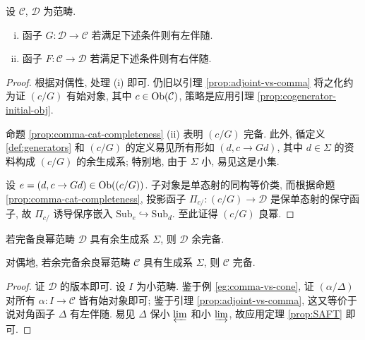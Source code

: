 \begin{theorem}[特殊伴随函子定理]\label{prop:SAFT}
	设 $\mathcal{C}$, $\mathcal{D}$ 为范畴.
	\begin{enumerate}[(i)]
		\item 函子 $G: \mathcal{D} \to \mathcal{C}$ 若满足下述条件则有左伴随.
		\item 函子 $F: \mathcal{C} \to \mathcal{D}$ 若满足下述条件则有右伴随.
	\end{enumerate}
\end{theorem}
\begin{proof}
	根据对偶性, 处理 (i) 即可. 仍旧以引理 \ref{prop:adjoint-vs-comma} 将之化约为证 $(c/G)$ 有始对象, 其中 $c \in \operatorname{Ob}(\mathcal{C})$, 策略是应用引理 \ref{prop:cogenerator-initial-obj}.
	
	命题 \ref{prop:comma-cat-completeness} (ii) 表明 $(c/G)$ 完备. 此外, 循定义 \ref{def:generators} 和 $(c/G)$ 的定义易见所有形如 $(d, c \to Gd)$, 其中 $d \in \Sigma$ 的资料构成 $(c/G)$ 的余生成系; 特别地, 由于 $\Sigma$ 小, 易见这是小集.
	
	设 $e = (d, c \to Gd) \in \operatorname{Ob}((c/G))$. 子对象是单态射的同构等价类, 而根据命题 \ref{prop:comma-cat-completeness}, 投影函子 $\Pi_{c/}: (c/G) \to \mathcal{D}$ 是保单态射的保守函子, 故 $\Pi_{c/}$ 诱导保序嵌入 $\mathrm{Sub}_e \hookrightarrow \mathrm{Sub}_d$. 至此证得 $(c/G)$ 良幂.
\end{proof}

\begin{corollary}\label{prop:SAFT-completeness}
	若完备良幂范畴 $\mathcal{D}$ 具有余生成系 $\Sigma$, 则 $\mathcal{D}$ 余完备.
	
	对偶地, 若余完备余良幂范畴 $\mathcal{C}$ 具有生成系 $\Sigma$, 则 $\mathcal{C}$ 完备.
\end{corollary}
\begin{proof}
	证 $\mathcal{D}$ 的版本即可. 设 $I$ 为小范畴. 鉴于例 \ref{eg:comma-vs-cone}, 证 $(\alpha/\Delta)$ 对所有 $\alpha: I \to \mathcal{C}$ 皆有始对象即可; 鉴于引理 \ref{prop:adjoint-vs-comma}, 这又等价于说对角函子 $\Delta$ 有左伴随. 易见 $\Delta$ 保小 $\varprojlim$ 和小 $\varinjlim$, 故应用定理 \ref{prop:SAFT} 即可.
\end{proof}

